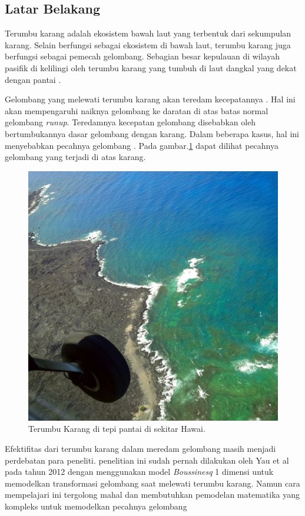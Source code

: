 \subsection{\textbf{Latar Belakang}}

Terumbu karang adalah ekosistem bawah laut yang terbentuk dari sekumpulan karang. Selain berfungsi sebagai ekosistem di bawah laut, terumbu karang juga berfungsi sebagai pemecah gelombang. Sebagian besar kepulauan di wilayah pasifik di kelilingi oleh terumbu karang yang tumbuh di laut dangkal yang dekat dengan pantai \cite{DemirbilekBoussinesq}.

Gelombang yang melewati terumbu karang akan teredam kecepatannya \cite{DemirbilekReport}. Hal ini akan mempengaruhi naiknya gelombang ke daratan di atas batas normal gelombang \emph{runup}\cite{nielsen1991wave}. Teredamnya kecepatan gelombang disebabkan oleh bertumbukannya dasar gelombang dengan karang. Dalam beberapa kasus, hal ini menyebabkan pecahnya gelombang \cite{DemirbilekReport}. Pada gambar.\ref{fig:hawai_coral} dapat dilihat pecahnya gelombang yang terjadi di atas karang.

\begin{figure}[htp]
    \begin{center}
        \includegraphics[scale=0.1]{./images/hawai_coral.jpg}
    \end{center}
    \caption{Terumbu Karang di tepi pantai di sekitar Hawai.}
    \label{fig:hawai_coral}
\end{figure}
\FloatBarrier
Efektifitas dari terumbu karang dalam meredam gelombang masih menjadi perdebatan para peneliti. penelitian ini sudah pernah dilakukan oleh Yau et al pada tahun 2012 dengan menggunakan model \emph{Boussinesq} 1 dimensi untuk memodelkan transformasi gelombang saat melewati terumbu karang. Namun cara mempelajari ini tergolong mahal dan membutuhkan pemodelan matematika yang kompleks untuk memodelkan pecahnya gelombang\cite{YAO201230}

